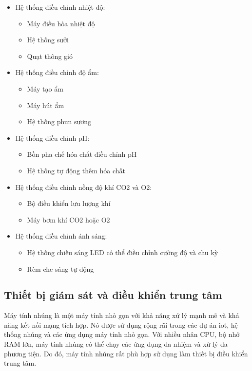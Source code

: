\begin{itemize}
	\item Hệ thống điều chỉnh nhiệt độ:
	\begin{itemize}
		\item Máy điều hòa nhiệt độ
		\item Hệ thống sưởi
		\item Quạt thông gió
	\end{itemize}
	\item Hệ thống điều chỉnh độ ẩm:
	\begin{itemize}
		\item Máy tạo ẩm
		\item Máy hút ẩm
		\item Hệ thống phun sương
	\end{itemize}
	\item Hệ thống điều chỉnh pH:
	\begin{itemize}
		\item Bồn pha chế hóa chất điều chỉnh pH
		\item Hệ thống tự động thêm hóa chất
	\end{itemize}
	\item Hệ thống điều chỉnh nồng độ khí CO2 và O2:
	\begin{itemize}
		\item Bộ điều khiển lưu lượng khí
		\item Máy bơm khí CO2 hoặc O2
	\end{itemize}
	\item Hệ thống điều chỉnh ánh sáng:
	\begin{itemize}
		\item Hệ thống chiếu sáng LED có thể điều chỉnh cường độ và chu kỳ
		\item Rèm che sáng tự động
	\end{itemize}

\end{itemize}

\subsection{Thiết bị giám sát và điều khiển trung tâm}

Máy tính nhúng là một máy tính nhỏ gọn với khả năng xử lý mạnh mẽ và khả năng kết nối mạng tích hợp. Nó được sử dụng rộng rãi trong các dự án \acrshort{iot}, hệ thống nhúng và các ứng dụng máy tính nhỏ gọn. Với nhiều nhân CPU, bộ nhớ RAM lớn, máy tính nhúng có thể chạy các ứng dụng đa nhiệm và xử lý đa phương tiện. Do đó, máy tính nhúng rất phù hợp sử dụng làm thiết bị điều khiển trung tâm.

